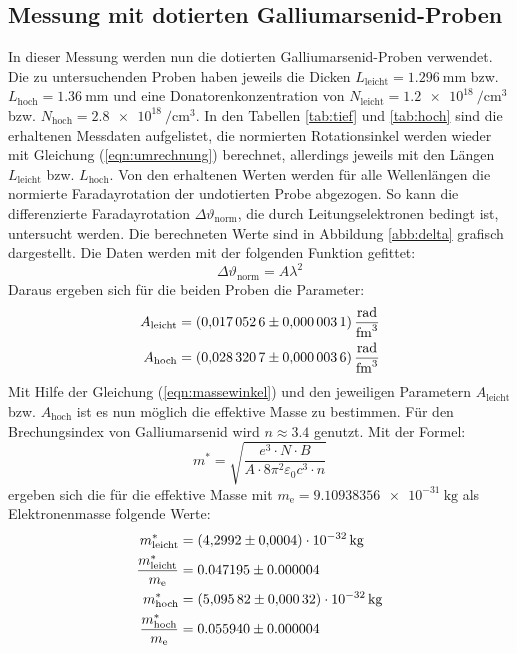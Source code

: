 \subsection{Messung mit dotierten Galliumarsenid-Proben}
\label{sec:dot}
In dieser Messung werden nun die dotierten Galliumarsenid-Proben verwendet.
Die zu untersuchenden Proben haben jeweils die Dicken $L_{\mathrm{leicht}}=\SI{1.296}{\milli\meter}$ bzw. $L_{\mathrm{hoch}}=\SI{1.36}{\milli\meter}$ und eine Donatorenkonzentration von $N_{\mathrm{leicht}}=\SI{1.2 e18}{\per\centi\cubic\meter}$ bzw. $N_{\mathrm{hoch}}=\SI{2.8 e18}{\per\centi\cubic\meter}$.
In den Tabellen \ref{tab:tief} und \ref{tab:hoch} sind die erhaltenen Messdaten aufgelistet, die normierten Rotationsinkel werden wieder mit Gleichung (\ref{eqn:umrechnung}) berechnet, allerdings jeweils mit den Längen $L_{\mathrm{leicht}}$ bzw. $L_{\mathrm{hoch}}$.
Von den erhaltenen Werten werden für alle Wellenlängen die normierte Faradayrotation der undotierten Probe abgezogen.
So kann die differenzierte Faradayrotation $\Delta\vartheta_\mathrm{norm}$, die durch Leitungselektronen bedingt ist, untersucht werden.
Die berechneten Werte sind in Abbildung \ref{abb:delta} grafisch dargestellt.
Die Daten werden mit der folgenden Funktion gefittet:
\begin{equation}
  \Delta\vartheta_{\mathrm{norm}} = A\lambda^2
\end{equation}
Daraus ergeben sich für die beiden Proben die Parameter:
\begin{align*}
  A_{\mathrm{leicht}} &= \SI{0.0170526 \pm 0.0000031}{\radian\per\femto\cubic\meter} \\
  A_{\mathrm{hoch}} &= \SI{0.0283207 \pm 0.0000036}{\radian\per\femto\cubic\meter}
\end{align*}
Mit Hilfe der Gleichung (\ref{eqn:massewinkel}) und den jeweiligen Parametern $A_{\mathrm{leicht}}$ bzw. $A_{\mathrm{hoch}}$ ist es nun möglich die effektive Masse zu bestimmen.
Für den Brechungsindex von Galliumarsenid wird $n \approx 3.4$ \cite{nGaAs} genutzt.
Mit der Formel:
\begin{equation}
  m^*=\sqrt{\frac{e^3\cdot N \cdot B}{A\cdot 8\pi^2\varepsilon_\mathrm{0} c^3 \cdot n }}
\end{equation}
ergeben sich die für die effektive Masse mit $m_\mathrm{e} = \SI{9.10938356 e-31}{\kilogram}$ als Elektronenmasse folgende Werte:
\begin{align*}
  m^*_{\mathrm{leicht}} &= \SI{4.2992 \pm 0.0004 e-32}{\kilogram} \\
  \frac{m^*_{\mathrm{leicht}}}{m_\mathrm{e}} &= 0.047195\pm 0.000004 \\
  m^*_{\mathrm{hoch}} &= \SI{5.09582 \pm 0.00032 e-32}{\kilogram} \\
  \frac{m^*_{\mathrm{hoch}}}{m_\mathrm{e}} &= 0.055940\pm 0.000004\\
\end{align*}

